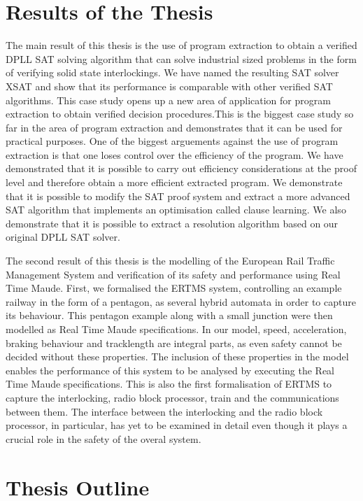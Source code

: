 \section{Results of the Thesis}


The main result of this thesis is the use of program extraction to obtain a verified DPLL SAT solving algorithm that can solve industrial sized problems in the form of verifying solid state interlockings. We have named the resulting SAT solver XSAT and show that its performance is comparable with other verified SAT algorithms. This case study opens up a new area of application for program extraction to obtain verified decision procedures.This is the biggest case study so far in the area of program extraction and demonstrates that it can be used for practical purposes.  One of the biggest arguements against the use of program extraction is that one loses control over the efficiency of the program. We have demonstrated that it is possible to carry out efficiency considerations at the proof level and therefore obtain a more efficient extracted program. We demonstrate that it is possible to modify the SAT proof system and extract a more advanced SAT algorithm that implements an optimisation called clause learning. We also demonstrate that it is possible to extract a resolution algorithm based on our original DPLL SAT solver.


The second result of this thesis is the modelling of the European Rail Traffic Management System and verification of its safety and performance using Real Time Maude. First, we formalised the ERTMS system, controlling an example railway in the form of a pentagon, as several hybrid automata in order to capture its behaviour.  This pentagon example along with a small junction were then modelled as Real Time Maude specifications. In our model, speed, acceleration, braking behaviour and tracklength are integral parts, as even safety cannot be decided without these properties. The inclusion of these properties in the model enables the performance of this system to be analysed by executing the Real Time Maude specifications. This is also the first formalisation of ERTMS to capture the interlocking, radio block processor, train and the communications between them. The interface between the interlocking and the radio block processor, in particular, has yet to be examined in detail even though it plays a crucial role in the safety of the overal system.



\section{Thesis Outline}

